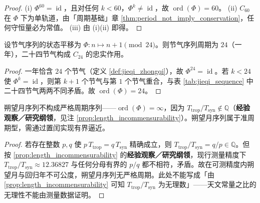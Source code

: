 \begin{proof}
(i) \(\Phi^{60}=\operatorname{id}\)，且对任何 \(k<60\)，\(\Phi^k\neq\operatorname{id}\)，故 \(\operatorname{ord}(\Phi)=60\)。
(ii) \(C_{60}\) 在 \(\Phi\) 下为单轨道，由「周期基础」章 \cref{thm:period_not_imply_conservation}，任何守恒量必为常值。
(iii) 由 (i)(ii) 即得。
\end{proof}

\begin{lemma}[节气序列的周期判定]\label{lem:jieqi_period}
设节气序列的状态平移为 \(\Phi:n\mapsto n+1\pmod{24}\)。则节气序列周期为 \(24\)（一年），二十四节气构成 \(C_{24}\) 的忠实作用。
\end{lemma}

\begin{proof}
一年恰含 \(24\) 个节气（定义 \ref{def:jieqi_zhongqi}），故 \(\Phi^{24}=\operatorname{id}\)。若 \(k<24\) 使 \(\Phi^k=\operatorname{id}\)，则第 \(k+1\) 个节气与第 \(1\) 个节气重合，与表 \ref{tab:jieqi_sequence} 中二十四节气两两不同矛盾。故 \(\operatorname{ord}(\Phi)=24\)。
\end{proof}

\begin{lemma}[朔望月序列的周期判定]\label{lem:synodic_month_period}
朔望月序列不构成严格周期序列——\(\operatorname{ord}(\Phi)=\infty\)，因为 \(T_{\text{trop}}/T_{\text{syn}}\notin\mathbb Q\)（\textbf{经验观察／研究纲领}，见注 \cref{prop:length_incommensurability}）。朔望月序列属于准周期型，需通过置闰实现有界逼近。
\end{lemma}

\begin{proof}
若存在整数 \(p,q\) 使 \(p\,T_{\text{trop}}=q\,T_{\text{syn}}\) 精确成立，则 \(T_{\text{trop}}/T_{\text{syn}}=q/p\in\mathbb Q\)。但按 \cref{prop:length_incommensurability} 的\textbf{经验观察／研究纲领}，现行测量精度下 \(T_{\text{trop}}/T_{\text{syn}}\approx 12.36827\) 与任何分母有界的 \(p/q\) 都不相符，矛盾。故在可测精度内朔望月与回归年不可公度，朔望月序列无严格周期。此处不能写成「由 \cref{prop:length_incommensurability} 可知 \(T_{\text{trop}}/T_{\text{syn}}\) 为无理数」——天文常量之比的无理性不能由测量数据证明。
\end{proof}


